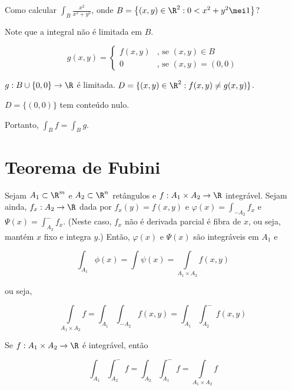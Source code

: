 \documentclass{book}
\begin{document}
\begin{ex}
Como calcular $\int_B {\frac{x^2}{x^2 + y^2}}$, onde $B = \left\{ (x,y) \in \R^2: 0 < x^2 + y^2 \mei 1 \right\}$?
\end{ex}

\begin{dem}
Note que a integral n\~ao \'e limitada em $B$.

\begin{equation*}
  g(x,y) =
  \begin{cases}
    f(x,y) 	& \mbox{, se } (x,y) \in B \\
    0 	& \mbox{, se } (x,y) = (0,0)
  \end{cases}
\end{equation*}

$g:B \cup \{ 0,0 \} \to \R$ \'e limitada. $D = \{ (x,y) \in \R^2: f(x,y) \ne g(x,y) \}$.

$D = \{(0,0)\}$ tem conte\'udo nulo.

Portanto, $\int_B f = \int_B g$.
\end{dem}


\section{Teorema de Fubini}\label{sec28}

\begin{teo}[Fubini]
\begin{sloppypar}
Sejam $A_1 \subset \R^m$ e $A_2 \subset \R^n$ ret\^angulos e ${f:A_1 \times A_2 \to \R}$ integr\'avel. Sejam ainda, $f_x: A_2 \to \R$ dada por $f_x(y) = f(x,y)$ e $\varphi(x) = \int_{-A_2} f_x$ e $\Psi(x) = \int_{A_2}^{-} f_x$. (Neste caso, $f_x$ n\~ao \'e derivada parcial \'e fibra de $x$, ou seja, mant\'em $x$ fixo e integra $y$.) Ent\~ao, $\varphi(x)$ e $\Psi(x)$ s\~ao integr\'aveis em $A_1$ e
\end{sloppypar}

\[
\int_{A_1 } {\phi (x)}  = \int {\psi (x)}  = \int\limits_{A_1  \times A_2 } {f(x,y)} 
\]

ou seja,

\[
\int\limits_{A_1  \times A_2 } f  = \int_{A_1 } {\int_{ - A_2 } {f(x,y)} }  = \int_{A_1 } {\int_{A_2 }^ -  {f(x,y)} } 
\]
\end{teo}

\begin{cor}
Se $f:A_1 \times A_2 \to \R$ \'e integr\'avel, ent\~ao

\[
\int_{A_1 } {\int_{A_2 }^ -  f }  = \int_{A_2 } {\int_{A_1 }^ -  f }  = \int\limits_{A_1  \times A_2 } f
\]
\end{cor}
\end{document}
